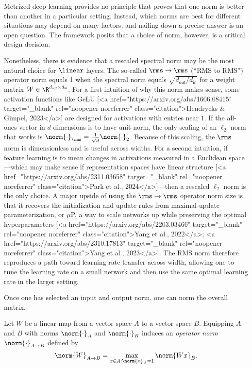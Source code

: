 Metrized deep learning provides no principle that proves that one norm is better than another in a particular setting. Instead, which norms are best for different situations may depend on many factors, and nailing down a precise answer is an open question. The framework posits that a choice of norm, however, is a critical design decision.

Nonetheless, there is evidence that a rescaled spectral norm may be the most natural choice for $\linear$ layers. The so-called $\rms\to\rms$ (“RMS to RMS”) operator norm equals 1 when the spectral norm equals $\sqrt{d_\mathsf{out}/d_\mathsf{in}}$ for a weight matrix $W \in \R^{d_\mathsf{out} \times d_\mathsf{in}}$. For a first intuition of why this norm makes sense, some activation functions like GeLU [<a href="https://arxiv.org/abs/1606.08415" target="_blank" rel="noopener noreferrer" class="citation">Hendrycks & Gimpel, 2023</a>] are designed for activations with entries near $1$. If the all-ones vector in $d$ dimensions is to have unit norm, the only scaling of an $\ell_2$ norm that works is $\norm{\cdot}_\rms = \tfrac{1}{\sqrt{d}} \norm{\cdot}_2$. Because of this scaling, the $\rms$ norm is dimensionless and is useful across widths. For a second intuition, if feature learning is to mean changes in activations measured in a Euclidean space---which may make sense if representation spaces have linear structure [<a href="https://arxiv.org/abs/2311.03658" target="_blank" rel="noopener noreferrer" class="citation">Park et al., 2024</a>]---then a rescaled $\ell_2$ norm is the only choice. A major upside of using the $\rms\to\rms$ operator norm  size is that it recovers the initialization and update rules from maximal-update parameterization, or $\mu$P, a way to scale networks up while preserving the optimal hyperparameters [<a href="https://arxiv.org/abs/2203.03466" target="_blank" rel="noopener noreferrer" class="citation">Yang et al., 2022</a>; <a href="https://arxiv.org/abs/2310.17813" target="_blank" rel="noopener noreferrer" class="citation">Yang et al., 2023</a>]. The RMS norm therefore reproduces a path toward learning rate transfer across width, allowing one to tune the learning rate on a small network and then use the same optimal learning rate in the larger setting.

Once one has selected an input and output norm, one can norm the overall matrix.

\begin{definitionbox}
    Let $W$ be a linear map from a vector space $A$ to a vector space $B$. Equipping $A$ and $B$ with norms $\norm{\cdot}_A$ and $\norm{\cdot}_B$ induces an \textit{operator norm} $\norm{\cdot}_{A \to B}$ defined by \[
        \norm{W}_{A \to B} = \max_{x \in A : \norm{x}_A = 1} \norm{Wx}_B.
    \]
\end{definitionbox}


